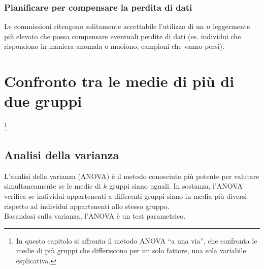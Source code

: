 \documentclass[10pt, draft]{book}
\begin{document}
\subsection{Pianificare per compensare la perdita di dati}

Le commissioni ritengono solitamente accettabile l'utilizzo di un $n$ leggermente più elevato che possa compensare eventuali perdite di dati (es. individui che rispondono in maniera anomala o muoiono, campioni che vanno persi).

\chapter{Confronto tra le medie di più di due gruppi}\footnote{In questo capitolo si affronta il metodo ANOVA ``a una via'', che confronta le medie di più gruppi che differiscono per un solo fattore, una sola variabile esplicativa.}

\section{Analisi della varianza}

L'analisi della varianza (ANOVA) è il metodo conosciuto più potente per valutare simultaneamente se le medie di $k$ gruppi siano uguali. In sostanza, l'ANOVA verifica se individui appartenenti a differenti gruppi siano in media più diversi rispetto ad individui appartenenti allo stesso gruppo.\\
Basandosi sulla varianza, l'ANOVA è un test parametrico.
\end{document}
